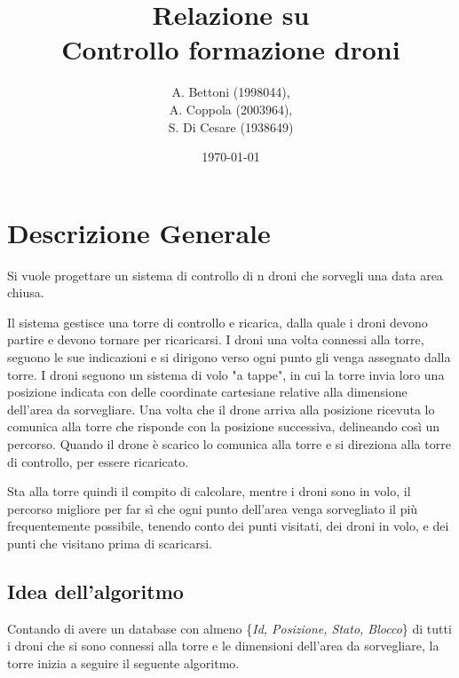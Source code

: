 \documentclass[a4paper, 12pt]{report}
\title{Relazione su \\
Controllo formazione droni}
\author{A. Bettoni (1998044),\\ A. Coppola (2003964),\\S. Di Cesare (1938649)}
\date{\today}
\begin{document}
\maketitle
\newpage
\tableofcontents
\newpage
\chapter{Descrizione Generale}
Si vuole progettare un sistema di controllo di n droni che sorvegli una data area chiusa.

Il sistema gestisce una torre di controllo e ricarica, dalla quale i droni devono partire e devono tornare per ricaricarsi. 
I droni una volta connessi alla torre, seguono le sue indicazioni e si dirigono verso ogni punto gli venga assegnato dalla torre.
I droni seguono un sistema di volo "a tappe", in cui la torre invia loro una posizione indicata con delle coordinate cartesiane
relative alla dimensione dell'area da sorvegliare. Una volta che il drone arriva alla posizione ricevuta lo comunica alla torre che risponde con la posizione successiva, delineando così un percorso.
Quando il drone è scarico lo comunica alla torre e si direziona alla torre di controllo, per essere ricaricato.

Sta alla torre quindi il compito di calcolare, mentre i droni sono in volo, il percorso migliore per far sì che ogni punto dell'area venga sorvegliato 
il più frequentemente possibile, tenendo conto dei punti visitati, dei droni in volo, e dei punti che visitano prima di scaricarsi.
\newpage
\section{Idea dell'algoritmo}
Contando di avere un database con almeno \{\textit{Id, Posizione, Stato, Blocco}\} di tutti i droni che si sono connessi alla torre e le dimensioni dell'area da sorvegliare, la torre inizia a seguire il seguente algoritmo.
\end{document}

